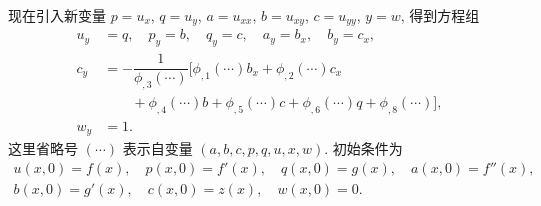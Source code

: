 \begin{Example}
现在引入新变量 $p=u_x$, $q=u_y$, $a=u_{xx}$, $b=u_{xy}$, $c=u_{yy}$, $y=w$, 得到方程组
\begin{equation}\label{eq:first-order-scalar-nonlinear-system}
\begin{aligned}
u_y&=q,\quad p_y=b,\quad q_y=c,\quad a_y=b_x,\quad b_y=c_x,\\
c_y&=-\dfrac1{\phi_{,3}(\cdots)}
\bigl[\phi_{,1}(\cdots)b_x+\phi_{,2}(\cdots)c_x\\
&\qquad+\phi_{,4}(\cdots)b+\phi_{,5}(\cdots)c+\phi_{,6}(\cdots)q+\phi_{,8}(\cdots)\bigr],\\
w_y&=1.
\end{aligned}
\end{equation}
这里省略号 $(\cdots)$ 表示自变量 $(a,b,c,p,q,u,x,w)$. 初始条件为
\begin{equation}\label{eq:first-order-scalar-nonlinear-initial-data}
\begin{gathered}
u(x,0)=f(x),\quad p(x,0)=f'(x),\quad q(x,0)=g(x),\quad a(x,0)=f''(x),\\
b(x,0)=g'(x),\quad c(x,0)=z(x),\quad w(x,0)=0.
\end{gathered}
\end{equation}
\end{Example}

